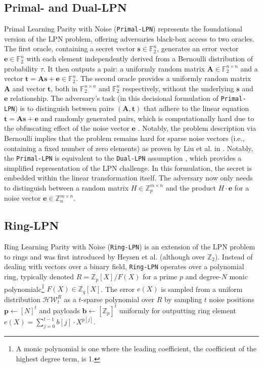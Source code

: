 \subsection{Primal- and Dual-LPN}
Primal Learning Parity with Noise (\texttt{Primal-LPN}) represents the foundational version of the LPN problem, offering adversaries black-box access to two oracles. The first oracle, containing a secret vector \( \mathbf{s} \in \mathbb{F}_2^{n} \), generates an error vector \( \mathbf{e} \in \mathbb{F}_2^{n} \) with each element independently derived from a Bernoulli distribution of probability \( \tau \). It then outputs a pair: a uniformly random matrix \( \mathbf{A} \in \mathbb{F}_2^{n\times n} \) and a vector \( \mathbf{t} = \mathbf{A}\mathbf{s} + \mathbf{e} \in \mathbb{F}_2^{n} \). The second oracle provides a uniformly random matrix \( \mathbf{A} \) and vector \( \mathbf{t} \), both in \( \mathbb{F}_2^{n\times n} \) and \( \mathbb{F}_2^{n} \) respectively, without the underlying \( \mathbf{s} \) and \( \mathbf{e} \) relationship. The adversary's task (in this decisional formulation of \texttt{Primal-LPN}) is to distinguish between pairs \((\mathbf{A}, \mathbf{t})\) that adhere to the linear equation \(\mathbf{t} = \mathbf{A}\mathbf{s} + \mathbf{e}\) and randomly generated pairs, which is computationally hard due to the obfuscating effect of the noise vector \( \mathbf{e} \) \cite{zhao2018hardness}. Notably, the problem description via Bernoulli implies that the problem remains hard for sparse noise vectors (i.e., containing a fixed number of zero elements) as proven by Liu et al. in \cite{liu2017hardness}. Notably, the \texttt{Primal-LPN} is equivalent to the \texttt{Dual-LPN} assumption \cite{couteau2021silver}, which provides a simplified representation of the LPN challenge. In this formulation, the secret is embedded within the linear transformation itself. The adversary now only needs to distinguish between a random matrix $H \in \mathbb{Z}_p^{m \times n}$ and the product $H \cdot \mathbf{e}$ for a noise vector $\mathbf{e}\in \mathbb{Z}_n^{m \times n}$.

\subsection{Ring-LPN}
\label{prelim:ring_lpn}
Ring Learning Parity with Noise (\texttt{Ring-LPN}) is an extension of the LPN problem to rings and was first introduced by Heysen et al. (although over $\mathbb{Z}_2$). Instead of dealing with vectors over a binary field, \texttt{Ring-LPN} operates over a polynomial ring, typically denoted $R =\mathbb{Z}_p[X]/F(X)$ for a prime $p$ and degree-$N$ monic polynomialc\footnote{A monic polynomial is one where the leading coefficient, the coefficient of the highest degree term, is 1.} $F(X)\in \mathbb{Z}_q[X] $. The error $e(X)$ is sampled from a uniform distribution $\mathcal{H W}_{t}^{R}$ as a $t$-sparse polynomial over $R$ by sampling $t$ noise positions $\mathbf{p} \leftarrow [N]^t$ and payloads $\mathbf{b} \leftarrow [\mathbb{Z}_p]^t$ uniformly for outputting ring element $e(X) = \sum_{j=0}^{t-1} b[j] \cdot X^{p[j]}$. 

